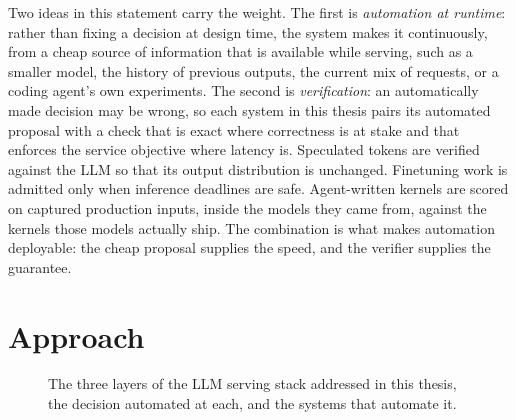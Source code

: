 Two ideas in this statement carry the weight.
The first is \emph{automation at runtime}: rather than fixing a decision at design time, the system makes it continuously, from a cheap source of information that is available while serving, such as a smaller model, the history of previous outputs, the current mix of requests, or a coding agent's own experiments.
The second is \emph{verification}: an automatically made decision may be wrong, so each system in this thesis pairs its automated proposal with a check that is exact where correctness is at stake and that enforces the service objective where latency is.
Speculated tokens are verified against the LLM so that its output distribution is unchanged.
Finetuning work is admitted only when inference deadlines are safe.
Agent-written kernels are scored on captured production inputs, inside the models they came from, against the kernels those models actually ship.
The combination is what makes automation deployable: the cheap proposal supplies the speed, and the verifier supplies the guarantee.

\section{Approach}
\label{intro:sec:approach}

\begin{figure}[t]
\centering
{}
\caption{The three layers of the LLM serving stack addressed in this thesis, the decision automated at each, and the systems that automate it.}
\label{intro:fig:stack}
\end{figure}

